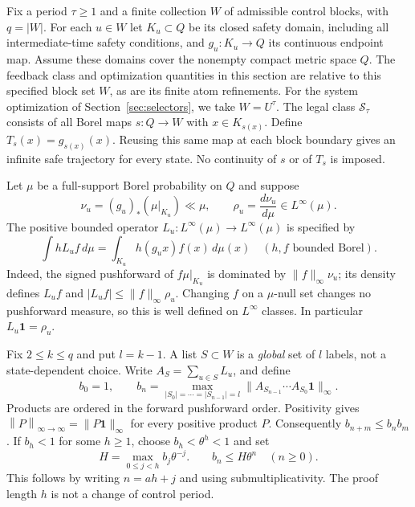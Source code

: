 \documentclass[11pt,reqno]{amsart}
\numberwithin{equation}{section}
\theoremstyle{definition}
\newcommand{\one}{\mathbf 1}
\newcommand{\opnorm}[1]{\left\|#1\right\|_{\infty\to\infty}}
\begin{document}
Fix a period $\tau\ge1$ and a finite collection $W$ of admissible
control blocks, with $q=|W|$. For each $u\in W$ let $K_u\subset Q$
be its closed safety domain, including all intermediate-time safety
conditions, and $g_u:K_u\to Q$ its continuous endpoint map.
Assume these domains cover the nonempty compact metric space $Q$.
The feedback class and optimization quantities in this section are
relative to this specified block set $W$, as are its finite atom
refinements. For the system optimization of Section~\ref{sec:selectors},
we take $W=U^\tau$.
The legal class $\mathcal S_\tau$ consists of all Borel maps
$s:Q\to W$ with $x\in K_{s(x)}$. Define
$T_s(x)=g_{s(x)}(x)$. Reusing this same map at each block boundary
gives an infinite safe trajectory for every state. No continuity of
$s$ or of $T_s$ is imposed.

Let $\mu$ be a full-support Borel probability on $Q$ and suppose
\begin{equation}\label{eq:cap-density}
 \nu_u=(g_u)_*(\mu|_{K_u})\ll\mu,\qquad
 \rho_u=\frac{d\nu_u}{d\mu}\in L^\infty(\mu).
\end{equation}
The positive bounded operator $L_u:L^\infty(\mu)\to L^\infty(\mu)$
is specified by
\begin{equation}\label{eq:cap-transfer}
 \int hL_uf\,d\mu=\int_{K_u}h(g_ux)f(x)\,d\mu(x)
 \quad(h,f\text{ bounded Borel}).
\end{equation}
Indeed, the signed pushforward of $f\mu|_{K_u}$ is dominated by
$\|f\|_\infty\nu_u$; its density defines $L_uf$ and
$|L_uf|\le\|f\|_\infty\rho_u$. Changing $f$ on a $\mu$-null
set changes no pushforward measure, so this is well defined on
$L^\infty$ classes. In particular $L_u\one=\rho_u$.

Fix $2\le k\le q$ and put $l=k-1$. A list $S\subset W$ is a
\emph{global} set of $l$ labels, not a state-dependent choice.
Write $A_S=\sum_{u\in S}L_u$, and define
\begin{equation}\label{eq:cap-bn}
 b_0=1,\qquad
 b_n=\max_{|S_0|=\cdots=|S_{n-1}|=l}
 \|A_{S_{n-1}}\cdots A_{S_0}\one\|_\infty.
\end{equation}
Products are ordered in the forward pushforward order. Positivity gives
$\opnorm{P}=\|P\one\|_\infty$ for every positive product $P$.
Consequently $b_{n+m}\le b_nb_m$. If $b_h<1$ for some $h\ge1$,
choose $b_h<\theta^h<1$ and set
\begin{equation}\label{eq:cap-exp}
 H=\max_{0\le j<h}b_j\theta^{-j}.
 \qquad b_n\le H\theta^n\quad(n\ge0).
\end{equation}
This follows by writing $n=ah+j$ and using submultiplicativity.
The proof length $h$ is not a change of control period.
\end{document}
